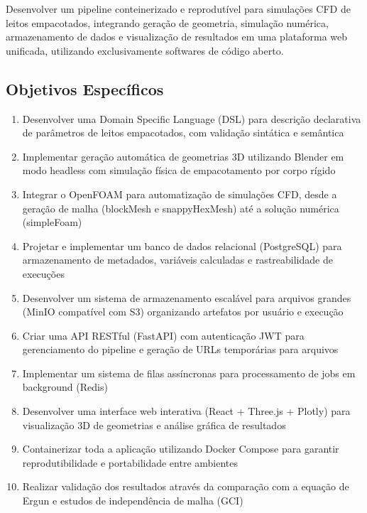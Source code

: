 Desenvolver um pipeline conteinerizado e reprodutível para simulações CFD de leitos empacotados, integrando geração de geometria, simulação numérica, armazenamento de dados e visualização de resultados em uma plataforma web unificada, utilizando exclusivamente softwares de código aberto.

\subsection{Objetivos Específicos}

\begin{enumerate}
    \item Desenvolver uma Domain Specific Language (DSL) para descrição declarativa de parâmetros de leitos empacotados, com validação sintática e semântica
    
    \item Implementar geração automática de geometrias 3D utilizando Blender em modo headless com simulação física de empacotamento por corpo rígido
    
    \item Integrar o OpenFOAM para automatização de simulações CFD, desde a geração de malha (blockMesh e snappyHexMesh) até a solução numérica (simpleFoam)
    
    \item Projetar e implementar um banco de dados relacional (PostgreSQL) para armazenamento de metadados, variáveis calculadas e rastreabilidade de execuções
    
    \item Desenvolver um sistema de armazenamento escalável para arquivos grandes (MinIO compatível com S3) organizando artefatos por usuário e execução
    
    \item Criar uma API RESTful (FastAPI) com autenticação JWT para gerenciamento do pipeline e geração de URLs temporárias para arquivos
    
    \item Implementar um sistema de filas assíncronas para processamento de jobs em background (Redis)
    
    \item Desenvolver uma interface web interativa (React + Three.js + Plotly) para visualização 3D de geometrias e análise gráfica de resultados
    
    \item Containerizar toda a aplicação utilizando Docker Compose para garantir reprodutibilidade e portabilidade entre ambientes
    
    \item Realizar validação dos resultados através da comparação com a equação de Ergun e estudos de independência de malha (GCI)
\end{enumerate}

